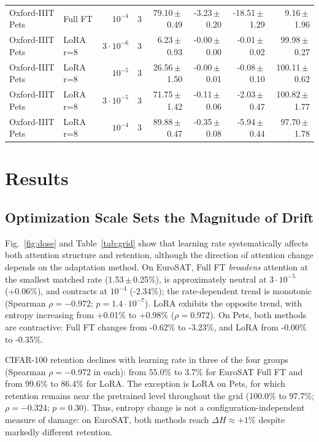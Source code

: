 \documentclass[conference]{IEEEtran}
\begin{document}
\begin{table}[!t]
\begin{tabular}{llrrrrrr}
Oxford-IIIT Pets & Full FT & $10^{-4}$ & 3 & 79.10\,$\pm$\,0.49 & -3.23\,$\pm$\,0.20 & -18.51\,$\pm$\,1.29 & 9.16\,$\pm$\,1.96 \\
Oxford-IIIT Pets & LoRA r=8 & $3\cdot 10^{-6}$ & 3 & 6.23\,$\pm$\,0.93 & -0.00\,$\pm$\,0.00 & -0.01\,$\pm$\,0.02 & 99.98\,$\pm$\,0.27 \\
Oxford-IIIT Pets & LoRA r=8 & $10^{-5}$ & 3 & 26.56\,$\pm$\,1.50 & -0.00\,$\pm$\,0.01 & -0.08\,$\pm$\,0.10 & 100.11\,$\pm$\,0.62 \\
Oxford-IIIT Pets & LoRA r=8 & $3\cdot 10^{-5}$ & 3 & 71.75\,$\pm$\,1.42 & -0.11\,$\pm$\,0.06 & -2.03\,$\pm$\,0.47 & 100.82\,$\pm$\,1.77 \\
Oxford-IIIT Pets & LoRA r=8 & $10^{-4}$ & 3 & 89.88\,$\pm$\,0.47 & -0.35\,$\pm$\,0.08 & -5.94\,$\pm$\,0.44 & 97.70\,$\pm$\,1.78 \\
\bottomrule
\end{tabular}
\end{table}

\section{Results}
\subsection{Optimization Scale Sets the Magnitude of Drift}
Fig.~\ref{fig:dose} and Table~\ref{tab:grid} show that learning rate systematically affects both attention structure and retention, although the direction of attention change depends on the adaptation method. On EuroSAT, Full FT \emph{broadens} attention at the smallest matched rate (1.53\,$\pm$\,0.25\%), is approximately neutral at $3\cdot 10^{-5}$ (+0.06\%), and contracts at $10^{-4}$ (-2.34\%); the rate-dependent trend is monotonic (Spearman $\rho=-0.972$; $p=1.4\cdot 10^{-7}$). LoRA exhibits the opposite trend, with entropy increasing from +0.01\% to +0.98\% ($\rho=0.972$). On Pets, both methods are contractive: Full FT changes from -0.62\% to -3.23\%, and LoRA from -0.00\% to -0.35\%.

CIFAR-100 retention declines with learning rate in three of the four groups (Spearman $\rho=-0.972$ in each): from 55.0\% to 3.7\% for EuroSAT Full FT and from 99.6\% to 86.4\% for LoRA. The exception is LoRA on Pets, for which retention remains near the pretrained level throughout the grid (100.0\% to 97.7\%; $\rho=-0.324$; $p=0.30$). Thus, entropy change is not a configuration-independent measure of damage: on EuroSAT, both methods reach $\Delta H\approx+1\%$ despite markedly different retention.
\end{document}
